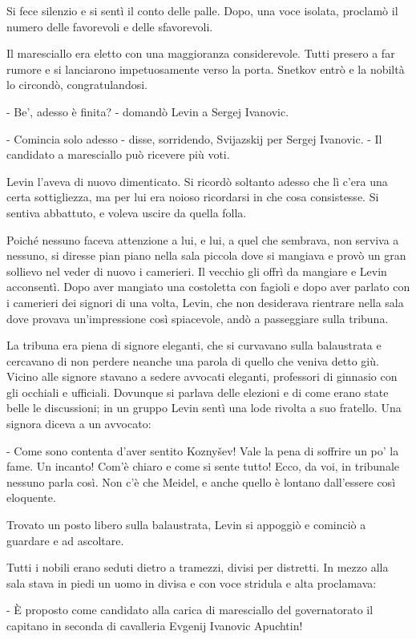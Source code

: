 Si fece silenzio e si sentì il conto delle palle. Dopo, una voce isolata, proclamò il numero delle favorevoli e delle sfavorevoli. 

Il maresciallo era eletto con una maggioranza considerevole. Tutti presero a far rumore e si lanciarono impetuosamente verso la porta. Snetkov entrò e la nobiltà lo circondò, congratulandosi. 

- Be', adesso è finita? - domandò Levin a Sergej Ivanovic. 

- Comincia solo adesso - disse, sorridendo, Svijazskij per Sergej Ivanovic. - Il candidato a maresciallo può ricevere più voti. 

Levin l'aveva di nuovo dimenticato. Si ricordò soltanto adesso che lì c'era una certa sottigliezza, ma per lui era noioso ricordarsi in che cosa consistesse. Si sentiva abbattuto, e voleva uscire da quella folla. 

Poiché nessuno faceva attenzione a lui, e lui, a quel che sembrava, non serviva a nessuno, si diresse pian piano nella sala piccola dove si mangiava e provò un gran sollievo nel veder di nuovo i camerieri. Il vecchio gli offrì da mangiare e Levin acconsentì. Dopo aver mangiato una costoletta con fagioli e dopo aver parlato con i camerieri dei signori di una volta, Levin, che non desiderava rientrare nella sala dove provava un'impressione così spiacevole, andò a passeggiare sulla tribuna. 

La tribuna era piena di signore eleganti, che si curvavano sulla balaustrata e cercavano di non perdere neanche una parola di quello che veniva detto giù. Vicino alle signore stavano a sedere avvocati eleganti, professori di ginnasio con gli occhiali e ufficiali. Dovunque si parlava delle elezioni e di come erano state belle le discussioni; in un gruppo Levin sentì una lode rivolta a suo fratello. Una signora diceva a un avvocato: 

- Come sono contenta d'aver sentito Koznyšev! Vale la pena di soffrire un po' la fame. Un incanto! Com'è chiaro e come si sente tutto! Ecco, da voi, in tribunale nessuno parla così. Non c'è che Meidel, e anche quello è lontano dall'essere così eloquente. 

Trovato un posto libero sulla balaustrata, Levin si appoggiò e cominciò a guardare e ad ascoltare. 

Tutti i nobili erano seduti dietro a tramezzi, divisi per distretti. In mezzo alla sala stava in piedi un uomo in divisa e con voce stridula e alta proclamava: 

- È proposto come candidato alla carica di maresciallo del governatorato il capitano in seconda di cavalleria Evgenij Ivanovic Apuchtin! 

